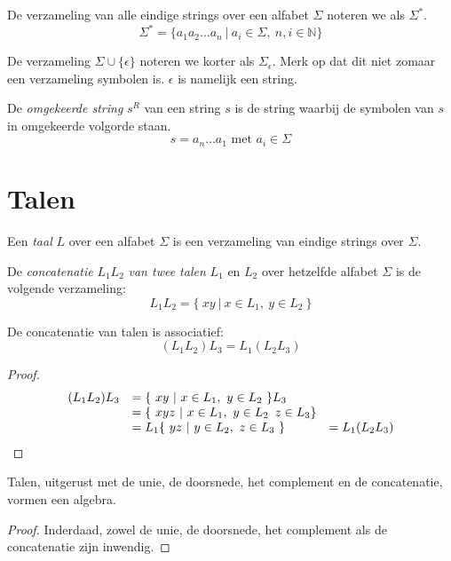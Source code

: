 \documentclass[main.tex]{subfiles}
\begin{document}
\begin{de} 
  De verzameling van alle eindige strings over een alfabet $\Sigma$ noteren we als $\Sigma^{*}$.
  \[ \Sigma^{*} = \{ a_{1}a_{2}\ldots a_{n}\ |\ a_{i}\in \Sigma,\ n,i\in \mathbb{N} \} \]
\end{de}

\begin{de}
  De verzameling $\Sigma \cup \{\epsilon\}$ noteren we korter als $\Sigma_{\epsilon}$.
  Merk op dat dit niet zomaar een verzameling symbolen is. $\epsilon$ is namelijk een string.
\end{de}

\begin{de}
  De \emph{omgekeerde string} $s^{R}$ van een string $s$ is de string waarbij de symbolen van $s$ in omgekeerde volgorde staan.
  \[ s = a_{n}\ldots a_{1} \text{ met } a_{i} \in \Sigma \]
\end{de}

\section{Talen}
\label{sec:talen}

\begin{de}
  Een \emph{taal} $L$ over een alfabet $\Sigma$ is een verzameling van eindige strings over $\Sigma$.
\end{de}

\begin{de}
  De \emph{concatenatie} $L_1L_2$ \emph{van twee talen} $L_1$ en $L_2$ over hetzelfde alfabet $\Sigma$ is de volgende verzameling:
  \[
  L_1L_2 = \{\ xy\ |\ x \in L_1,\ y \in L_2\ \} 
  \]
\end{de}

\begin{ei}
  De concatenatie van talen is associatief:
  \[
  (L_1L_2)L_3 = L_1(L_2L_3)
  \]

  \begin{proof}
    \[
    \begin{array}{r l l}
      (L_1L_2)L_3 &= \{\ xy\ |\ x \in L_1,\ y \in L_2\ \}L_3 &\\
                 &= \{\ xyz\ |\ x \in L_1,\ y \in L_2\,\ z \in L_3\} &\\
                 &= L_1\{\ yz\ |\ y \in L_2,\ z \in L_3\ \} &= L_1(L_2L_3)
    \end{array}
    \]
  \end{proof}
\end{ei}

\begin{ei}
  Talen, uitgerust met de unie, de doorsnede, het complement en de concatenatie, vormen een algebra.
  \begin{proof}
    Inderdaad, zowel de unie, de doorsnede, het complement als de concatenatie zijn inwendig. 
  \end{proof}
\end{ei}
\end{document}
